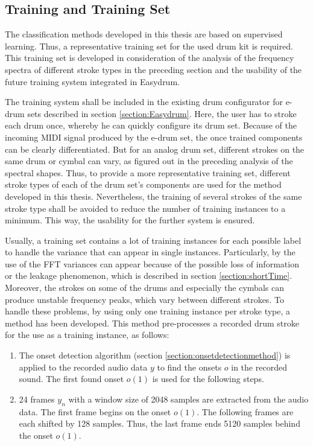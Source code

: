 \subsection{Training and Training Set}
\label{section:training}

The classification methods developed in this thesis are based on supervised learning. Thus, a representative training set for the used drum kit is required. This training set is developed in consideration of the analysis of the frequency spectra of different stroke types in the preceding section and the usability of the future training system integrated in Easydrum.

The training system shall be included in the existing drum configurator for e-drum sets described in section \ref{section:Easydrum}. Here, the user has to stroke each drum once, whereby he can quickly configure its drum set. Because of the incoming MIDI signal produced by the e-drum set, the once trained components can be clearly differentiated. But for an analog drum set, different strokes on the same drum or cymbal can vary, as figured out in the preceding analysis of the spectral shapes. Thus, to provide a more representative training set, different stroke types of each of the drum set's components are used for the method developed in this thesis. Nevertheless, the training of several strokes of the same stroke type shall be avoided to reduce the number of training instances to a minimum. This way, the usability for the further system is ensured.

Usually, a training set contains a lot of training instances for each possible label to handle the variance that can appear in single instances. Particularly, by the use of the FFT variances can appear because of the possible loss of information or the leakage phenomenon, which is described in section \ref{section:shortTime}. Moreover, the strokes on some of the drums and especially the cymbals can produce unstable frequency peaks, which vary between different strokes. To handle these problems, by using only one training instance per stroke type, a method has been developed. This method pre-processes a recorded drum stroke for the use as a training instance, as follows:

\begin{enumerate}
  \item The onset detection algorithm (section \ref{section:onsetdetectionmethod}) is applied to the recorded audio data $y$ to find the onsets $o$ in the recorded sound. The first found onset $o(1)$ is used for the following steps.
  \item 24 frames $y_n$ with a window size of 2048 samples are extracted from the audio data. The first frame begins on the onset $o(1)$. The following frames are each shifted by 128 samples. Thus, the last frame ends 5120 samples behind the onset $o(1)$.
\end{enumerate}

